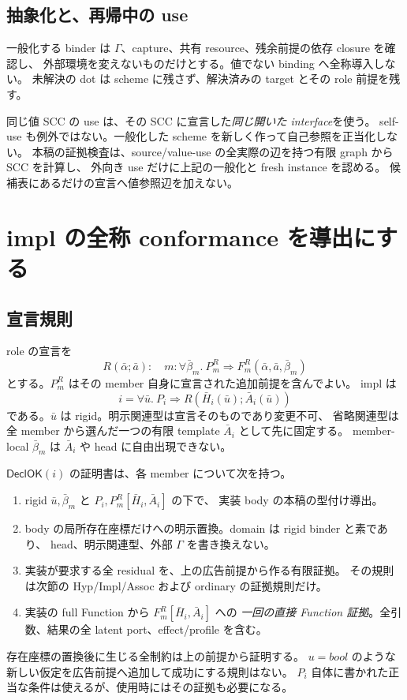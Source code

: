 \documentclass[11pt,a4paper]{article}
\begin{document}
\subsection{抽象化と、再帰中の use}

一般化する binder は \(\Gamma\)、capture、共有 resource、残余前提の依存 closure を確認し、
外部環境を変えないものだけとする。値でない binding へ全称導入しない。
未解決の dot は scheme に残さず、解決済みの target とその role 前提を残す。

同じ値 SCC の use は、その SCC に宣言した\emph{同じ開いた interface}を使う。
self-use も例外ではない。一般化した scheme を新しく作って自己参照を正当化しない。
本稿の証拠検査は、source/value-use の全実際の辺を持つ有限 graph から SCC を計算し、
外向き use だけに上記の一般化と fresh instance を認める。
候補表にあるだけの宣言へ値参照辺を加えない。

\section{impl の全称 conformance を導出にする}
\label{sec:impl}

\subsection{宣言規則}

role の宣言を
\[
 R(\bar\alpha;\bar a):\quad
 m:\forall\bar\beta_m.\ P^R_m\Rightarrow F^R_m(\bar\alpha,\bar a,\bar\beta_m)
\]
とする。\(P^R_m\) はその member 自身に宣言された追加前提を含んでよい。
impl は
\[
 i=\forall\bar u.\ P_i\Rightarrow R(\bar H_i(\bar u);\bar A_i(\bar u))
\]
である。\(\bar u\) は rigid。明示関連型は宣言そのものであり変更不可、
省略関連型は全 member から選んだ一つの有限 template \(\bar A_i\) として先に固定する。
member-local \(\bar\beta_m\) は \(\bar A_i\) や head に自由出現できない。

\(\mathsf{DeclOK}(i)\) の証明書は、各 member について次を持つ。
\begin{enumerate}
\item rigid \(\bar u,\bar\beta_m\) と \(P_i,P^R_m[\bar H_i,\bar A_i]\) の下で、
      実装 body の本稿の型付け導出。
\item body の局所存在座標だけへの明示置換。domain は rigid binder と素であり、
      head、明示関連型、外部 \(\Gamma\) を書き換えない。
\item 実装が要求する全 residual を、上の広告前提から作る有限証拠。
      その規則は次節の Hyp/Impl/Assoc および ordinary の証拠規則だけ。
\item 実装の full Function から \(F^R_m[\bar H_i,\bar A_i]\) への
      \emph{一回の直接 Function 証拠}。全引数、結果の全 latent port、effect/profile を含む。
\end{enumerate}
存在座標の置換後に生じる全制約は上の前提から証明する。
\(u=bool\) のような新しい仮定を広告前提へ追加して成功にする規則はない。
\(P_i\) 自体に書かれた正当な条件は使えるが、使用時にはその証拠も必要になる。
\end{document}
